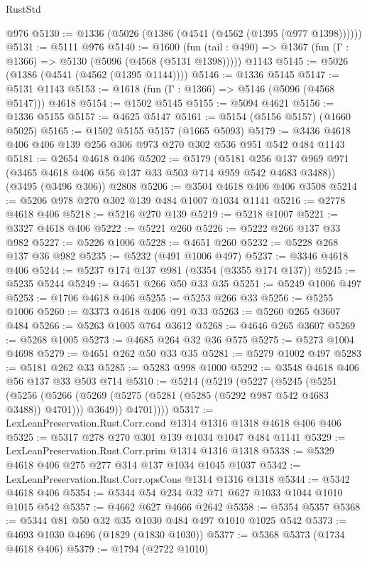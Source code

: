 \begin{lexlean}{RustStd}
\begin{coremodule}
    @976
@5130 := @1336 (@5026 (@1386 (@4541 (@4562 (@1395 (@977 @1398))))))
@5131 := @5111 @976
@5140 := @1600
    (fun (tail : @490) => @1367 (fun (Γ : @1366) => @5130 (@5096 (@4568 (@5131 @1398)))))
    @1143
@5145 := @5026 (@1386 (@4541 (@4562 (@1395 @1144))))
@5146 := @1336 @5145
@5147 := @5131 @1143
@5153 := @1618 (fun (Γ : @1366) => @5146 (@5096 (@4568 @5147))) @4618
@5154 := @1502 @5145
@5155 := @5094 @4621
@5156 := @1336 @5155
@5157 := @4625 @5147
@5161 := @5154 (@5156 @5157) (@1660 @5025)
@5165 := @1502 @5155 @5157 (@1665 @5093)
@5179 := @3436 @4618 @406 @406 @139 @256 @306 @973 @270 @302 @536 @951 @542 @484 @1143
@5181 := @2654 @4618 @406
@5202 := @5179
    (@5181 @256 @137 @969 @971 (@3465 @4618 @406 @56 @137 @33 @503 @714 @959 @542 @4683 @3488))
    (@3495 (@3496 @306))
    @2808
@5206 := @3504 @4618 @406 @406 @3508
@5214 := @5206 @978 @270 @302 @139 @484 @1007 @1034 @1141
@5216 := @2778 @4618 @406
@5218 := @5216 @270 @139
@5219 := @5218 @1007
@5221 := @3327 @4618 @406
@5222 := @5221 @260
@5226 := @5222 @266 @137 @33 @982
@5227 := @5226 @1006
@5228 := @4651 @260
@5232 := @5228 @268 @137 @36 @982
@5235 := @5232 (@491 @1006 @497)
@5237 := @3346 @4618 @406
@5244 := @5237 @174 @137 @981 (@3354 (@3355 @174 @137))
@5245 := @5235 @5244
@5249 := @4651 @266 @50 @33 @35
@5251 := @5249 @1006 @497
@5253 := @1706 @4618 @406
@5255 := @5253 @266 @33
@5256 := @5255 @1006
@5260 := @3373 @4618 @406 @91 @33
@5263 := @5260 @265 @3607 @484
@5266 := @5263 @1005 @764 @3612
@5268 := @4646 @265 @3607
@5269 := @5268 @1005
@5273 := @4685 @264 @32 @36 @575
@5275 := @5273 @1004 @4698
@5279 := @4651 @262 @50 @33 @35
@5281 := @5279 @1002 @497
@5283 := @5181 @262 @33
@5285 := @5283 @998 @1000
@5292 := @3548 @4618 @406 @56 @137 @33 @503 @714
@5310 := @5214
    (@5219
      (@5227
        (@5245
          (@5251
            (@5256
              (@5266 (@5269 (@5275 (@5281 (@5285 (@5292 @987 @542 @4683 @3488)) @4701))) @3649))
            @4701))))
@5317 := LexLeanPreservation.Rust.Corr.cond @1314 @1316 @1318 @4618 @406 @406
@5325 := @5317 @278 @270 @301 @139 @1034 @1047 @484 @1141
@5329 := LexLeanPreservation.Rust.Corr.prim @1314 @1316 @1318
@5338 := @5329 @4618 @406 @275 @277 @314 @137 @1034 @1045 @1037
@5342 := LexLeanPreservation.Rust.Corr.opsCons @1314 @1316 @1318
@5344 := @5342 @4618 @406
@5354 := @5344 @54 @234 @32 @71 @627 @1033 @1044 @1010 @1015 @542
@5357 := @4662 @627 @4666 @2642
@5358 := @5354 @5357
@5368 := @5344 @81 @50 @32 @35 @1030 @484 @497 @1010 @1025 @542
@5373 := @4693 @1030 @4696 (@1829 (@1830 @1030))
@5377 := @5368 @5373 (@1734 @4618 @406)
@5379 := @1794 (@2722 @1010)

\end{coremodule}
\end{lexlean}
